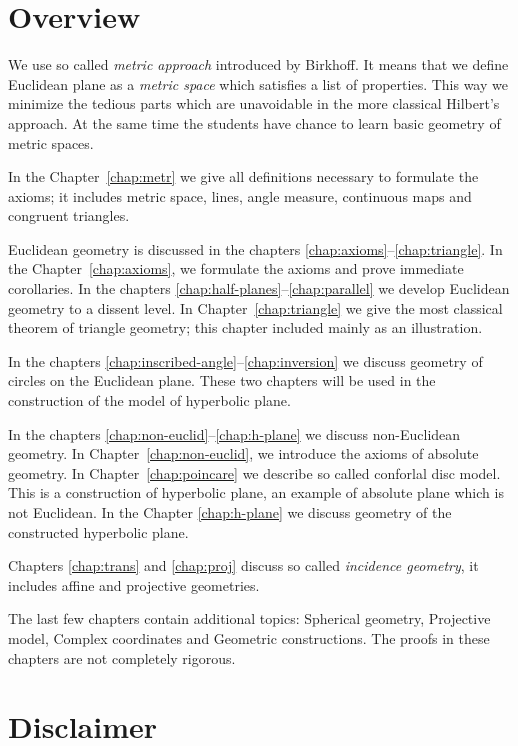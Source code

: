\section*{Overview}

We use so called {}\emph{metric approach} introduced by Birkhoff.
It means that we define Euclidean plane as a {}\emph{metric space} which satisfies a list of properties.
This way we minimize the tedious parts
which are unavoidable in the more classical Hilbert's approach.
At the same time the students have chance to learn basic geometry of metric spaces.

In the Chapter~\ref{chap:metr} we give all definitions necessary to formulate the axioms;
it includes metric space, lines, angle measure, continuous maps and congruent triangles.

Euclidean geometry is discussed in the chapters \ref{chap:axioms}--\ref{chap:triangle}.
In the  Chapter~\ref{chap:axioms}, we formulate the axioms and prove immediate corollaries.
In the chapters \ref{chap:half-planes}--\ref{chap:parallel} 
we develop Euclidean geometry to a dissent level.
In Chapter~\ref{chap:triangle} we give the most classical theorem of triangle geometry;
this chapter included mainly as an illustration.

In the chapters \ref{chap:inscribed-angle}--\ref{chap:inversion} we discuss geometry of circles on the Euclidean plane. 
These two chapters 
will be used in the construction of the model of hyperbolic plane.

In the chapters \ref{chap:non-euclid}--\ref{chap:h-plane}
we discuss non-Euclidean geometry.
In Chapter~\ref{chap:non-euclid},
we introduce the axioms of absolute geometry.
In Chapter~\ref{chap:poincare}
we describe so called conforlal disc model.
This is a construction of hyperbolic plane,
an example of absolute plane which is not Euclidean.
In the Chapter \ref{chap:h-plane} we discuss geometry of the constructed hyperbolic plane.

Chapters \ref{chap:trans} 
and 
\ref{chap:proj} 
discuss so called {}\emph{incidence geometry},
it includes affine and projective geometries.

The last few chapters contain additional topics:
Spherical geometry, 
Projective model,
Complex coordinates
and Geometric constructions.
The proofs in these chapters are not completely rigorous.

\section*{Disclaimer}

